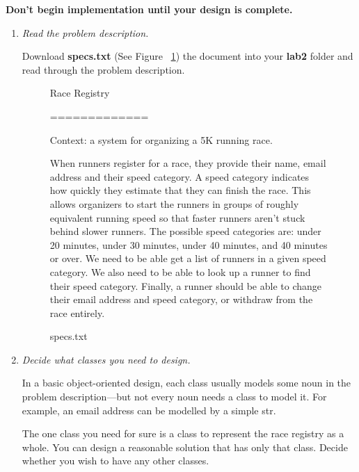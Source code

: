 \documentclass[12pt]{article}
\begin{document}
\bigskip

\textbf{Don’t begin implementation until your design is complete.}

\begin{enumerate}[1.]
\item \textit{Read the problem description.}

Download \textbf{specs.txt} (See Figure ~\ref{fig:specsText}) the document into your \textbf{lab2} folder and read
through the problem description.

\begin{figure}
    \begin{mdframed}
        Race Registry

        =============

        \bigskip

        Context: a system for organizing a 5K running race.

        \bigskip

        When runners register for a race, they provide their name, email address and
        their speed category. A speed category indicates how quickly they estimate that
        they can finish the race. This allows organizers to start the runners in groups
        of roughly equivalent running speed so that faster runners aren't stuck behind
        slower runners. The possible speed categories are: under 20 minutes, under 30
        minutes, under 40 minutes, and 40 minutes or over. We need to be able get a list
        of runners in a given speed category. We also need to be able to look up a
        runner to find their speed category. Finally, a runner should be able to change
        their email address and speed category, or withdraw from the race entirely.

    \end{mdframed}
    \caption{specs.txt}
    \label{fig:specsText}
\end{figure}

\item \textit{Decide what classes you need to design.}

In a basic object-oriented design, each class usually models some noun in the
problem description—but not every noun needs a class to model it. For example,
an email address can be modelled by a simple str.

\bigskip

The one class you need for sure is a class to represent the race registry as a
whole. You can design a reasonable solution that has only that class. Decide
 whether you wish to have any other classes.


\end{enumerate}
\end{document}
